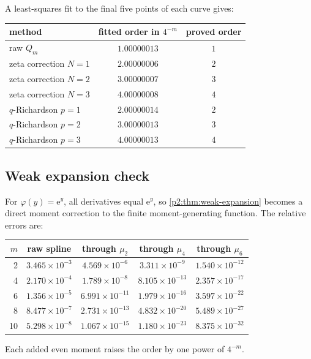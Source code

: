 \documentclass[11pt,oneside]{article}
\numberwithin{equation}{section}
\theoremstyle{definition}
\theoremstyle{remark}
\newcommand{\e}{\mathrm e}
\begin{document}
A least-squares fit to the final five points of each curve gives:
\begin{center}
\small
\begin{tabular}{@{}lcc@{}}
\toprule
method & fitted order in $4^{-m}$ & proved order \\
\midrule
raw $Q_m$ & $1.00000013$ & $1$\\
zeta correction $N=1$ & $2.00000006$ & $2$\\
zeta correction $N=2$ & $3.00000007$ & $3$\\
zeta correction $N=3$ & $4.00000008$ & $4$\\
$q$-Richardson $p=1$ & $2.00000014$ & $2$\\
$q$-Richardson $p=2$ & $3.00000013$ & $3$\\
$q$-Richardson $p=3$ & $4.00000013$ & $4$\\
\bottomrule
\end{tabular}
\end{center}

\subsection{Weak expansion check}

For $\varphi(y)=\e^y$, all derivatives equal $\e^y$, so
\cref{p2:thm:weak-expansion} becomes a direct moment correction to the finite moment-generating
function.  The relative errors are:
\begin{center}
\small
\begin{tabular}{@{}rcccc@{}}
\toprule
$m$ & raw spline & through $\mu_2$ & through $\mu_4$ & through $\mu_6$\\
\midrule
2 & $3.465\times10^{-3}$ & $4.569\times10^{-6}$ & $3.311\times10^{-9}$ & $1.540\times10^{-12}$\\
4 & $2.170\times10^{-4}$ & $1.789\times10^{-8}$ & $8.105\times10^{-13}$ & $2.357\times10^{-17}$\\
6 & $1.356\times10^{-5}$ & $6.991\times10^{-11}$ & $1.979\times10^{-16}$ & $3.597\times10^{-22}$\\
8 & $8.477\times10^{-7}$ & $2.731\times10^{-13}$ & $4.832\times10^{-20}$ & $5.489\times10^{-27}$\\
10 & $5.298\times10^{-8}$ & $1.067\times10^{-15}$ & $1.180\times10^{-23}$ & $8.375\times10^{-32}$\\
\bottomrule
\end{tabular}
\end{center}
Each added even moment raises the order by one power of $4^{-m}$.
\end{document}
